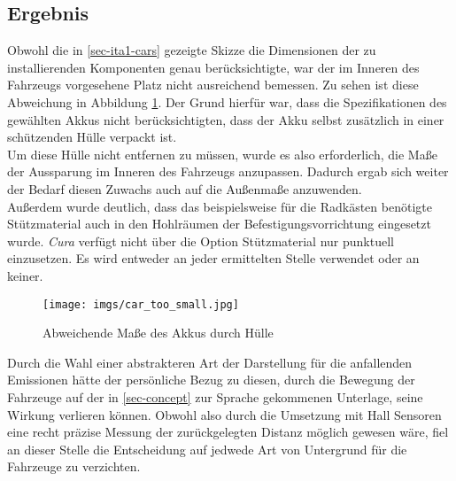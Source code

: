 \documentclass[.../Dokumentation.tex]{subfiles}
\begin{document}
\subsection{Ergebnis}\label{sec-ita1-result}
Obwohl die in \ref{sec-ita1-cars} gezeigte Skizze die Dimensionen der zu 
installierenden Komponenten genau berücksichtigte, war der im Inneren des 
Fahrzeugs vorgesehene Platz nicht ausreichend bemessen.
Zu sehen ist diese Abweichung in Abbildung \ref{fig-car-too-small}.
Der Grund hierfür war, dass die Spezifikationen des gewählten Akkus nicht 
berücksichtigten, dass der Akku selbst zusätzlich in einer schützenden Hülle 
verpackt ist.\\
Um diese Hülle nicht entfernen zu müssen, wurde es also erforderlich, die 
Maße der Aussparung im Inneren des Fahrzeugs anzupassen. Dadurch ergab 
sich weiter der Bedarf diesen Zuwachs auch auf die Außenmaße anzuwenden.\\
Außerdem wurde deutlich, dass das beispielsweise für die Radkästen benötigte 
Stützmaterial auch in den Hohlräumen der Befestigungsvorrichtung 
eingesetzt wurde. \textit{Cura} verfügt nicht über die Option Stützmaterial nur 
punktuell einzusetzen. Es wird entweder an jeder ermittelten Stelle verwendet 
oder an keiner. 
\begin{figure}[H]
    \begin{center}
    \texttt{[image: imgs/car\_too\_small.jpg]}
    \caption{Abweichende Maße des Akkus durch Hülle}
    \label{fig-car-too-small}
    \end{center}
\end{figure}
\noindent
Durch die Wahl einer abstrakteren Art der Darstellung für die anfallenden 
Emissionen hätte der persönliche Bezug zu diesen, durch die Bewegung der 
Fahrzeuge auf der in \ref{sec-concept} zur Sprache gekommenen Unterlage, seine 
Wirkung verlieren können. Obwohl also durch die Umsetzung mit Hall Sensoren 
eine recht präzise Messung der zurückgelegten Distanz möglich gewesen wäre, 
fiel an dieser Stelle die Entscheidung auf jedwede Art von Untergrund 
für die Fahrzeuge zu verzichten.
\end{document}
